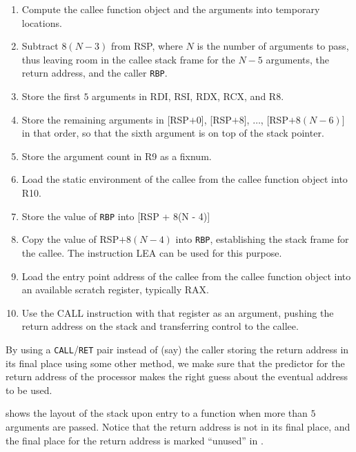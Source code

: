\begin{enumerate}
\item Compute the callee function object and the arguments into
  temporary locations.
\item Subtract $8(N - 3)$ from RSP, where $N$ is the number of
  arguments to pass, thus leaving room in the callee stack frame for
  the $N - 5$ arguments, the return address, and the caller \texttt{RBP}.
\item Store the first $5$ arguments in RDI, RSI, RDX, RCX, and R8.
\item Store the remaining arguments in [RSP$ + 0$], [RSP$ + 8$],
  $\ldots$, [RSP$ + 8(N - 6)$] in that order, so that the sixth
  argument is on top of the stack pointer.
\item Store the argument count in R9 as a fixnum.
\item Load the static environment of the callee from the callee
  function object into R10.
\item Store the value of \texttt{RBP} into [RSP + 8(N - 4)]
\item Copy the value of RSP$ + 8(N - 4)$ into \texttt{RBP}, establishing the
  stack frame for the callee.  The instruction LEA can be used for
  this purpose.
\item Load the entry point address of the callee from the callee
  function object into an available scratch register, typically RAX.
\item Use the CALL instruction with that register as an argument,
  pushing the return address on the stack and transferring control to
  the callee.
\end{enumerate}

By using a \texttt{CALL}/\texttt{RET} pair instead of (say) the caller
storing the return address in its final place using some other method,
we make sure that the predictor for the return address of the
processor makes the right guess about the eventual address to be used.


 shows the layout of the stack
upon entry to a function when more than $5$ arguments are passed.
Notice that the return address is not in its final place, and the
final place for the return address is marked ``unused'' in
.

